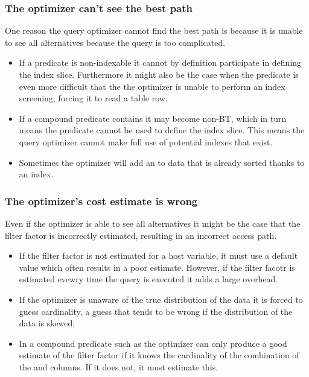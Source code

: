 \subsubsection{The optimizer can't see the best path}
One reason the query optimizer cannot find the best path is because it is unable
to see all alternatives because the query is too complicated.

\begin{itemize}
\item If a predicate is non-indexable it cannot by definition participate in
  defining the index slice. Furthermore it might also be the case when the
  predicate is even more difficult that the the optimizer is unable to perform
  an index screening, forcing it to read a table row.
\item If a compound predicate contains  it may become non-BT, which in
  turn means the predicate cannot be used to define the index slice. This means
  the query optimizer cannot make full use of potential indexes that exist.
\item Sometimes the optimizer will add an  to data that is already
  sorted thanks to an index.
\end{itemize}

\subsubsection{The optimizer's cost estimate is wrong}
Even if the optimizer is able to see all alternatives it might be the case that
the filter factor is incorrectly estimated, resulting in an incorrect access
path.

\begin{itemize}
\item If the filter factor is not estimated for a host variable, it must use a
  default value which often results in a poor estimate. However, if the filter
  facotr is estimated evewry time the query is executed it adds a large
  overhead.
\item If the optimizer is unaware of the true distribution of the data it is
  forced to guess cardinality, a guess that tends to be wrong if the
  distribution of the data is skewed;
\item In a compound predicate such as  the optimizer can only produce a good estimate of the filter factor
  if it knows the cardinality of the combination of the  and
   columns. If it does not, it must estimate this.
\end{itemize}
